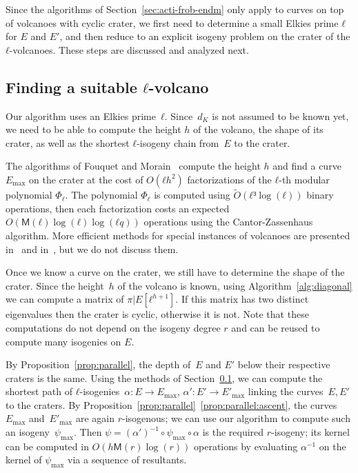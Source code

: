 \documentclass{lms}
\def\cout#1{\mathsf{#1}}
\newcommand{\tildO}{\tilde{O}}
\newcommand{\MM}{\cout{M}}
\begin{document}
Since the algorithms of Section~\ref{sec:acti-frob-endm} only apply to
curves on top of volcanoes with cyclic crater, we first need to
determine a small Elkies prime $ℓ$ for $E$ and $E'$, and then reduce
to an explicit isogeny problem on the crater of the
$ℓ$-volcanoes. These steps are discussed and analyzed next.

\subsection{Finding a suitable $ℓ$-volcano}
\label{sub:shape-volcano}

Our algorithm uses an Elkies prime~$ℓ$.  Since~$d_K$ is not assumed to
be known yet, we need to be able to compute the height $h$ of the
volcano, the shape of its crater, as well as the shortest $ℓ$-isogeny
chain from~$E$ to the crater.

The algorithms of Fouquet and Morain~\cite{volcano} compute the height
$h$ and find a curve $E_{\max}$ on the crater at the cost of $O(ℓh^2)$
factorizations of the $ℓ$-th modular polynomial $Φ_ℓ$. The polynomial
$Φ_ℓ$ is computed using $\tildO(ℓ³\log(ℓ))$ binary operations, then
each factorization costs an expected $O(\MM(ℓ)\log(ℓ)\log(ℓq))$
operations using the Cantor-Zassenhaus algorithm. More efficient
methods for special instances of volcanoes are presented
in~\cite{MiretMRV05} and in~\cite{ionica+joux13}, but we do not
discuss them.

Once we know a curve on the crater,
we still have to determine the shape of the crater.
Since the height~$h$ of the volcano is known,
using Algorithm~\ref{alg:diagonal} we can compute a matrix of $π|E[ℓ^{h+1}]$.
If this matrix has two distinct eigenvalues then the crater is cyclic,
otherwise it is not. Note that these computations do not depend on the isogeny
degree $r$ and can be reused to compute many isogenies on $E$.

By Proposition~\ref{prop:parallel},
the depth of~$E$ and $E'$ below their respective craters is the same.
Using the methods of Section~\ref{sub:shape-volcano},
we can compute the shortest path of $ℓ$-isogenies~$α: E → E_{\max}$,
$α': E' → E'_{\max}$ linking the curves~$E, E'$ to the craters.
By Proposition~\ref{prop:parallel}~\ref{prop:parallel:ascent},
the curves~$E_{\max}$ and~$E'_{\max}$ are again $r$-isogenous;
we can use our algorithm to compute such an isogeny~$ψ_{\max}$.
Then $ψ = (α')^{-1} ∘ ψ_{\max} ∘ α$ is the required $r$-isogeny; its
kernel can be computed in $O(h\MM(r)\log(r))$ operations by evaluating
$α^{-1}$ on the kernel of $ψ_{\max}$ via a sequence of resultants.
\end{document}
